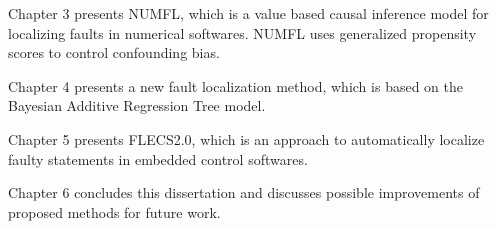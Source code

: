 Chapter 3 presents NUMFL, which is a value based causal inference model for localizing faults in numerical softwares. NUMFL uses generalized propensity scores to control confounding bias.

Chapter 4 presents a new fault localization method, which is based on  the Bayesian Additive Regression Tree model.

Chapter 5 presents FLECS2.0, which is an approach to automatically localize faulty statements in embedded control softwares.

Chapter 6 concludes this dissertation and discusses possible improvements of proposed methods for future work.



